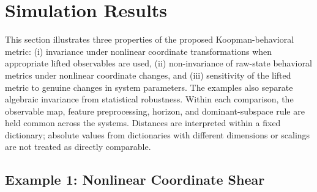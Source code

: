\documentclass[letterpaper, 10 pt, conference]{ieeeconf}  %
\begin{document}
\section{Simulation Results}
\label{sec:simulations}

This section illustrates three properties of the proposed Koopman-behavioral metric: (i) invariance under nonlinear coordinate transformations when appropriate lifted observables are used, (ii) non-invariance of raw-state behavioral metrics under nonlinear coordinate changes, and (iii) sensitivity of the lifted metric to genuine changes in system parameters.
The examples also separate algebraic invariance from statistical robustness. Within each comparison, the observable map, feature preprocessing, horizon, and dominant-subspace rule are held common across the systems. Distances are interpreted within a fixed dictionary; absolute values from dictionaries with different dimensions or scalings are not treated as directly comparable.



\subsection{Example 1: Nonlinear Coordinate Shear}
\end{document}
